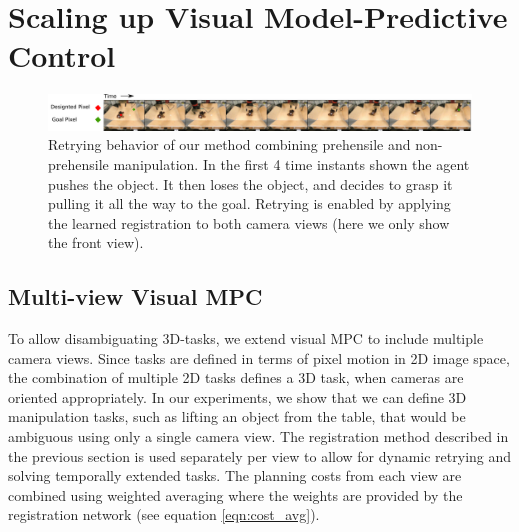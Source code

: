 \section{Scaling up Visual Model-Predictive Control}
\begin{figure}
	\centering
	\includegraphics[width=1.0\textwidth]{images_rfr/pick_place_plush.pdf}
	\caption{\small{Retrying behavior of our method combining prehensile and non-prehensile manipulation. In the first 4 time instants shown the agent pushes the object. It then loses the object, and decides to grasp it pulling it all the way to the goal. Retrying is enabled by applying the learned registration to both camera views (here we only show the front view).}}
	\label{fig:push_grasp}
	
\end{figure}


\label{sec:scalingup}
\subsection{Multi-view Visual MPC}
To allow disambiguating 3D-tasks, we extend visual MPC to include multiple camera views. Since tasks are defined in terms of pixel motion in 2D image space, the combination of multiple 2D tasks defines a 3D task, when cameras are oriented appropriately. In our experiments, we show that we can define 3D manipulation tasks, such as lifting an object from the table, that would be ambiguous using only a single camera view. The registration method described in the previous section is used separately per view to allow for dynamic retrying and solving temporally extended tasks. The planning costs from each view are combined using weighted averaging where the weights are provided by the registration network (see equation \ref{eqn:cost_avg}). 

